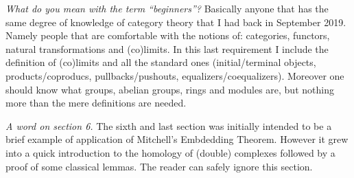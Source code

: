 \documentclass[12pt, english, reqno]{article}
\theoremstyle{myteo}
\begin{document}
\medskip\noindent\emph{What do you mean with the term ``beginners''?}
Basically anyone that has the same degree of knowledge of category theory that I had back in September 2019.
Namely people that are comfortable with the notions of: categories, functors, natural transformations and (co)limits.
In this last requirement I include the definition of (co)limits and all the standard ones (initial/terminal objects, products/coproducs, pullbacks/pushouts, equalizers/coequalizers).
Moreover one should know what groups, abelian groups, rings and modules are, but nothing more than the mere definitions are needed.

\medskip\noindent\emph{A word on section 6.}
The sixth and last section was initially intended to be a brief example of application of Mitchell's Embdedding Theorem.
However it grew into a quick introduction to the homology of (double) complexes followed by a proof of some classical lemmas.
The reader can safely ignore this section. 








\newpage

\end{document}
